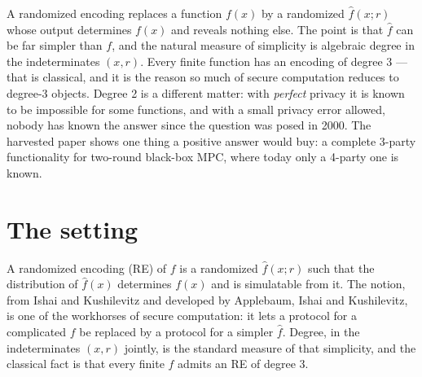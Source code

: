 \documentclass{aicr-conjecture}
\begin{document}

\vspace{0.4em}

\begin{informalconjecture}
A randomized encoding replaces a function $f(x)$ by a randomized
$\hat{f}(x;r)$ whose output determines $f(x)$ and reveals nothing else.
The point is that $\hat f$ can be far simpler than $f$, and the natural
measure of simplicity is algebraic degree in the indeterminates $(x,r)$.
Every finite function has an encoding of degree 3 --- that is classical, and
it is the reason so much of secure computation reduces to degree-3
objects. Degree 2 is a different matter: with \emph{perfect} privacy it is
known to be impossible for some functions, and with a small privacy error
allowed, nobody has known the answer since the question was posed in
2000. The harvested paper shows one thing a positive answer would buy: a
complete 3-party functionality for two-round black-box MPC, where today
only a 4-party one is known.
\end{informalconjecture}

\section{The setting}\label{sec:setting}

A randomized encoding (RE) of $f$ is a randomized $\hat{f}(x;r)$ such
that the distribution of $\hat f(x)$ determines $f(x)$ and is simulatable
from it. The notion, from Ishai and Kushilevitz and developed by
Applebaum, Ishai and Kushilevitz, is one of the workhorses of secure
computation: it lets a protocol for a complicated $f$ be replaced by a
protocol for a simpler $\hat f$. Degree, in the indeterminates $(x,r)$
jointly, is the standard measure of that simplicity, and the classical
fact is that every finite $f$ admits an RE of degree 3.
\end{document}
